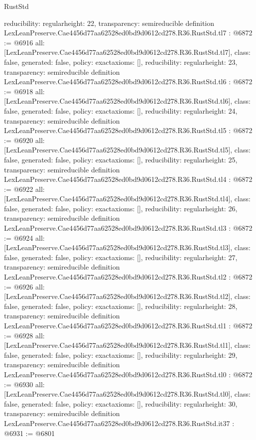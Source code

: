 \begin{lexlean}{RustStd}
\begin{coremodule}
{  reducibility: regular{height: 22},
  transparency: semireducible
}
definition LexLeanPreserve.Cae4456d77aa62528ed0bd9d0612cd278.R36.RustStd.tl7 : @6872 := @6916 {
  all: [LexLeanPreserve.Cae4456d77aa62528ed0bd9d0612cd278.R36.RustStd.tl7],
  class: false,
  generated: false,
  policy: exact{axioms: []},
  reducibility: regular{height: 23},
  transparency: semireducible
}
definition LexLeanPreserve.Cae4456d77aa62528ed0bd9d0612cd278.R36.RustStd.tl6 : @6872 := @6918 {
  all: [LexLeanPreserve.Cae4456d77aa62528ed0bd9d0612cd278.R36.RustStd.tl6],
  class: false,
  generated: false,
  policy: exact{axioms: []},
  reducibility: regular{height: 24},
  transparency: semireducible
}
definition LexLeanPreserve.Cae4456d77aa62528ed0bd9d0612cd278.R36.RustStd.tl5 : @6872 := @6920 {
  all: [LexLeanPreserve.Cae4456d77aa62528ed0bd9d0612cd278.R36.RustStd.tl5],
  class: false,
  generated: false,
  policy: exact{axioms: []},
  reducibility: regular{height: 25},
  transparency: semireducible
}
definition LexLeanPreserve.Cae4456d77aa62528ed0bd9d0612cd278.R36.RustStd.tl4 : @6872 := @6922 {
  all: [LexLeanPreserve.Cae4456d77aa62528ed0bd9d0612cd278.R36.RustStd.tl4],
  class: false,
  generated: false,
  policy: exact{axioms: []},
  reducibility: regular{height: 26},
  transparency: semireducible
}
definition LexLeanPreserve.Cae4456d77aa62528ed0bd9d0612cd278.R36.RustStd.tl3 : @6872 := @6924 {
  all: [LexLeanPreserve.Cae4456d77aa62528ed0bd9d0612cd278.R36.RustStd.tl3],
  class: false,
  generated: false,
  policy: exact{axioms: []},
  reducibility: regular{height: 27},
  transparency: semireducible
}
definition LexLeanPreserve.Cae4456d77aa62528ed0bd9d0612cd278.R36.RustStd.tl2 : @6872 := @6926 {
  all: [LexLeanPreserve.Cae4456d77aa62528ed0bd9d0612cd278.R36.RustStd.tl2],
  class: false,
  generated: false,
  policy: exact{axioms: []},
  reducibility: regular{height: 28},
  transparency: semireducible
}
definition LexLeanPreserve.Cae4456d77aa62528ed0bd9d0612cd278.R36.RustStd.tl1 : @6872 := @6928 {
  all: [LexLeanPreserve.Cae4456d77aa62528ed0bd9d0612cd278.R36.RustStd.tl1],
  class: false,
  generated: false,
  policy: exact{axioms: []},
  reducibility: regular{height: 29},
  transparency: semireducible
}
definition LexLeanPreserve.Cae4456d77aa62528ed0bd9d0612cd278.R36.RustStd.tl0 : @6872 := @6930 {
  all: [LexLeanPreserve.Cae4456d77aa62528ed0bd9d0612cd278.R36.RustStd.tl0],
  class: false,
  generated: false,
  policy: exact{axioms: []},
  reducibility: regular{height: 30},
  transparency: semireducible
}
definition LexLeanPreserve.Cae4456d77aa62528ed0bd9d0612cd278.R36.RustStd.it37 : @6931 := @6801 {
}
\end{coremodule}
\end{lexlean}
